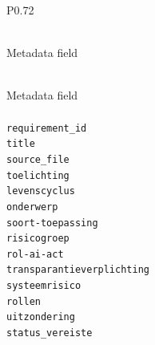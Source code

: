 \begingroup
\small
\setlength{\tabcolsep}{4pt}
\renewcommand{\arraystretch}{1.08}
\setlength{\LTcapwidth}{\textwidth}
\setlength{\LTleft}{0pt plus 1fill}
\setlength{\LTright}{0pt plus 1fill}
\begin{longtable}{P{0.72\textwidth}}
\caption{Metadata fields present in Algoritmekader requirement files.} \label{tab:algoritmekader-metadata-fields} \\
\toprule
Metadata field \\
\midrule
\endfirsthead
\caption[]{Metadata fields present in Algoritmekader requirement files.} \\
\toprule
Metadata field \\
\midrule
\endhead
\midrule
{} \\
\midrule
\endfoot
\bottomrule
\endlastfoot
\texttt{requirement\_\allowbreak{}id} \\
\texttt{title} \\
\texttt{source\_\allowbreak{}file} \\
\texttt{toelichting} \\
\texttt{levenscyclus} \\
\texttt{onderwerp} \\
\texttt{soort-\allowbreak{}toepassing} \\
\texttt{risicogroep} \\
\texttt{rol-\allowbreak{}ai-\allowbreak{}act} \\
\texttt{transparantieverplichting} \\
\texttt{systeemrisico} \\
\texttt{rollen} \\
\texttt{uitzondering} \\
\texttt{status\_\allowbreak{}vereiste} \\
\end{longtable}
\endgroup
